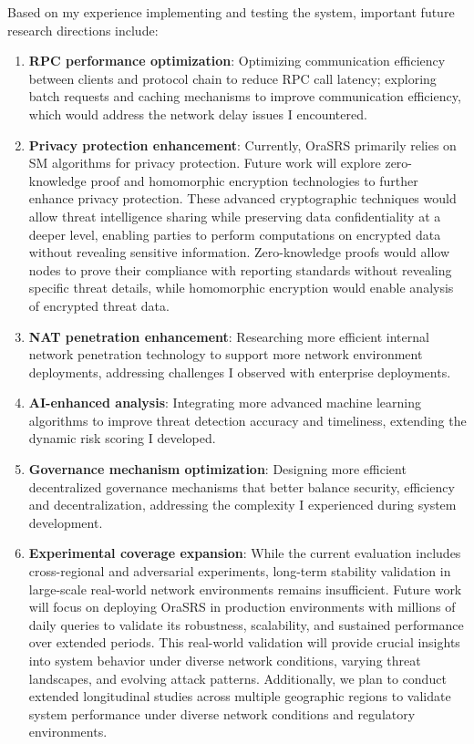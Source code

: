 \documentclass[12pt]{article}
\begin{document}
Based on my experience implementing and testing the system, important future research directions include:

\begin{enumerate}
\item \textbf{RPC performance optimization}: Optimizing communication efficiency between clients and protocol chain to reduce RPC call latency; exploring batch requests and caching mechanisms to improve communication efficiency, which would address the network delay issues I encountered.
\item \textbf{Privacy protection enhancement}: Currently, OraSRS primarily relies on SM algorithms for privacy protection. Future work will explore zero-knowledge proof and homomorphic encryption technologies to further enhance privacy protection. These advanced cryptographic techniques would allow threat intelligence sharing while preserving data confidentiality at a deeper level, enabling parties to perform computations on encrypted data without revealing sensitive information. Zero-knowledge proofs would allow nodes to prove their compliance with reporting standards without revealing specific threat details, while homomorphic encryption would enable analysis of encrypted threat data.
\item \textbf{NAT penetration enhancement}: Researching more efficient internal network penetration technology to support more network environment deployments, addressing challenges I observed with enterprise deployments.
\item \textbf{AI-enhanced analysis}: Integrating more advanced machine learning algorithms to improve threat detection accuracy and timeliness, extending the dynamic risk scoring I developed.
\item \textbf{Governance mechanism optimization}: Designing more efficient decentralized governance mechanisms that better balance security, efficiency and decentralization, addressing the complexity I experienced during system development.
\item \textbf{Experimental coverage expansion}: While the current evaluation includes cross-regional and adversarial experiments, long-term stability validation in large-scale real-world network environments remains insufficient. Future work will focus on deploying OraSRS in production environments with millions of daily queries to validate its robustness, scalability, and sustained performance over extended periods. This real-world validation will provide crucial insights into system behavior under diverse network conditions, varying threat landscapes, and evolving attack patterns. Additionally, we plan to conduct extended longitudinal studies across multiple geographic regions to validate system performance under diverse network conditions and regulatory environments.
\end{enumerate}
\end{document}
